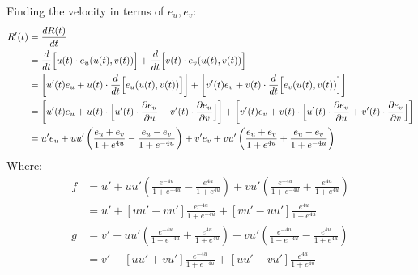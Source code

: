 \documentclass[a4paper, 11pt]{article}
\begin{document}
\begin{enumerate}[label=(\alph*)]
        Finding the velocity in terms of $e_u,e_v$:
        \begin{align*}
          R'(t) & = \dfrac{dR(t)}{dt}                                                                                                                                                                                    \\
                & = \dfrac{d}{dt}\Big[u(t)\cdot e_u(u(t),v(t))  \Big] + \dfrac{d}{dt}\Big[ v(t)\cdot e_v(u(t),v(t)) \Big]                                                                                                       \\
                & = \left[ u'(t)e_u  +u(t)\cdot\dfrac{d}{dt}\Big[e_u(u(t),v(t))\Big] \right] + \left[   v'(t)e_v +v(t)\cdot\dfrac{d}{dt}\Big[e_v(u(t),v(t))\Big]\right]                                                         \\
                & = \left[ u'(t)e_u  +u(t)\cdot\Big[u'(t)\cdot \dfrac{\partial e_u}{\partial u} + v'(t)\cdot \dfrac{\partial e_u}{\partial v}\Big] \right] + \left[   v'(t)e_v +v(t)\cdot\Big[u'(t)\cdot \dfrac{\partial e_v}{\partial u} + v'(t)\cdot \dfrac{\partial e_v}{\partial v}\Big]\right] \\
                & =  u'e_u  +uu'\left(
          \frac{e_u+e_v}{1+e^{4u}}
          -\frac{e_u-e_v}{1+e^{-4u}}
          \right)
          +    v'e_v +vu'\left(
          \frac{e_u+e_v}{1+e^{4u}}
          +\frac{e_u-e_v}{1+e^{-4u}}
          \right)
        \end{align*}
        Where:
        \begin{align*}
          f & = u'
          + uu'\left( \frac{e^{-4u}}{1+e^{-4u}} - \frac{e^{4u}}{1+e^{4u}} \right)
          + vu'\left(  \frac{e^{-4u}}{1+e^{-4u}} + \frac{e^{4u}}{1+e^{4u}} \right)
          \\
            & = u'
          + \left[ uu' + vu' \right]\frac{e^{-4u}}{1+e^{-4u}}
          + \left[ vu' - uu' \right]\frac{e^{4u}}{1+e^{4u}}
          \\
          g & = v'
          +  uu'\left( \frac{e^{-4u}}{1+e^{-4u}} + \frac{e^{4u}}{1+e^{4u}} \right)
          + vu'\left(  \frac{e^{-4u}}{1+e^{-4u}} - \frac{e^{4u}}{1+e^{4u}} \right) \\
            & = v'
          + \left[ uu' + vu' \right]\frac{e^{-4u}}{1+e^{-4u}}
          + \left[ uu'-vu' \right]\frac{e^{4u}}{1+e^{4u}}
          \\
        \end{align*}


\end{enumerate}
\end{document}
